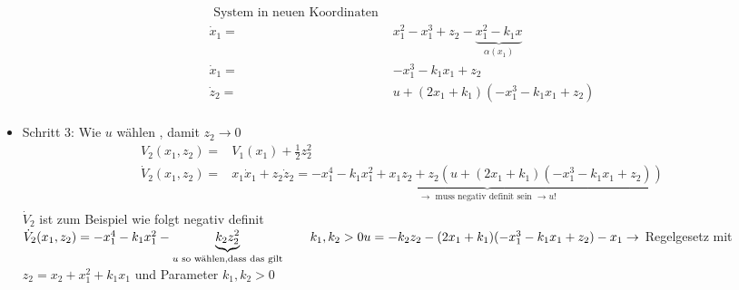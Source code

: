 \documentclass[ngerman]{tudscrreprt}
\begin{document}
\begin{itemize}
\begin{align*}
\text{ System in neuen Koordinaten }\\
\dot x_1 = & x_1^2 - x_1^3 + z_2 - \underbrace{x_1^2 - k_1 x}_{\alpha(x_1)}\\
\dot x_1 = & -x_1^3 - k_1x_1 + z_2 \tag{5.5a}\\
\dot z_2 = & u + (2 x_1 + k_1) (-x_1^3 - k_1 x_1 + z_2) \tag{5.5b}\\
\end{align*}
\item Schritt 3: Wie $u$ wählen , damit $z_2 \to 0$
\begin{align*}
V_2(x_1,z_2) = &V_1(x_1) + \frac{1}{2} z_2^2\\
\dot V_2(x_1,z_2) = & x_1 \dot x_1 + z_2 \dot z_2 = \underbrace{- x_1^4 - k_1x_1^2 + x_1 z_2 + z_2 (u +(2x_1 + k_1)(-x_1^3 - k_1 x_1 + z_2))}_{\rightarrow \text{ muss negativ definit sein }\to u!}\\
\end{align*}
$\dot V_2 $ ist zum Beispiel wie folgt negativ definit \\
$\dot V_2(x_1,z_2) = - x_1^4 - k_1 x_1^2 - \underbrace{k_2 z_2^2}_{u \text{ so wählen,dass das gilt}} \qquad k_1,k_2 > 0 \\
u = -k_2z_2 - (2x_1 + k_1)(-x_1^3 - k_1 x_1 + z_2) - x_1\\
\rightarrow$ Regelgesetz mit $z_2 = x_2 + x_1^2 + k_1 x_1$ und Parameter $k_1, k_2 > 0$
\end{itemize}
\end{document}
